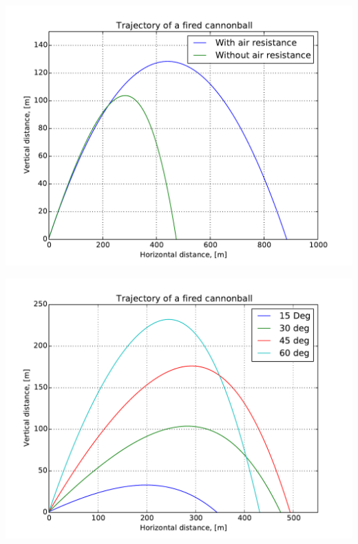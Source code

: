 \documentclass[english, 12pt]{beamer}
\begin{document}
\begin{frame}[fragile]
\begin{center}
	\includegraphics[width=\textwidth]{plot_cannonball2}
\end{center}
\end{frame}

\begin{frame}[fragile]
\begin{center}
	\includegraphics[width=\textwidth]{plot_cannonball3}
\end{center}
\end{frame}
\end{document}
